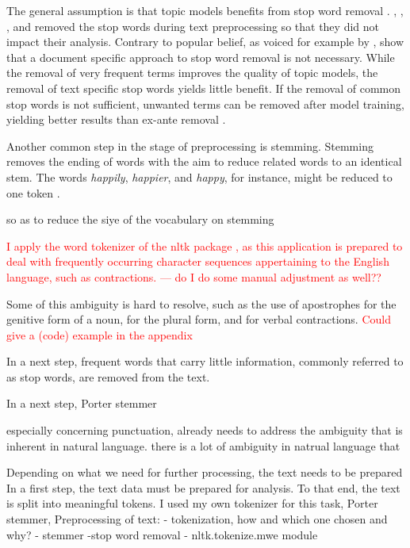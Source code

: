 \documentclass[11pt,a4paper,english,oneside]{book}
\numberwithin{equation}{chapter}
\begin{document}
The general assumption is that topic models benefits from stop word removal \cite[p. 432]{SchofieldA.MagnussonM.&MimnoD..2017}. \cite{Blei.2003}, \cite{Chem.2007}, \cite{Steyvers(2007)}, and \cite{Hofmann.2001} removed the stop words during text preprocessing so that they did not impact their analysis. Contrary to popular belief, as voiced for example by \citet[p. 7]{Darling.2011}, \cite{SchofieldA.MagnussonM.&MimnoD..2017} show that a document specific approach to stop word removal is not necessary. While the removal of very frequent terms improves the quality of topic models, the removal of text specific stop words yields little benefit. If the removal of common stop words is not sufficient, unwanted terms can be removed after model training, yielding better results than ex-ante removal \cite[p. 432]{SchofieldA.MagnussonM.&MimnoD..2017}.

Another common step in the stage of preprocessing is stemming. Stemming removes the ending of words with the aim to reduce related words to an identical stem. The words \textit{happily}, \textit{happier}, and \textit{happy}, for instance, might be reduced to one token \cite[p. 287]{Schofield.2016}. 

so as to reduce the siye of the vocabulary \cite{Schofield.2016} on stemming
\cite{Schofield.2017}

\textcolor{red}{I apply the word tokenizer of the nltk package \citep{Bird.2010}, as this application is prepared to deal with frequently occurring character sequences appertaining to the English language, such as contractions. --- do I do some manual adjustment as well??}


 Some of this ambiguity is hard to resolve, such as the use of apostrophes for the genitive form of a noun, for the plural form, and for verbal contractions. \textcolor{red}{Could give a (code) example in the appendix}

In a next step, frequent words that carry little information, commonly referred to as stop words, are removed from the text. 

In a next step, Porter stemmer 

 especially concerning punctuation,  already needs to address the ambiguity that is inherent in natural language. there is a lot of ambiguity in natrual language that 

Depending on what we need for further processing, the text needs to be prepared 
In a first step, the text data must be prepared for analysis. To that end, the text is split into meaningful tokens. I used my own tokenizer for this task,
Porter stemmer,  
Preprocessing of text:
 - tokenization, how and which one chosen and why?
 - stemmer 
 	-stop word removal
 	- nltk.tokenize.mwe module
 	
\end{document}
